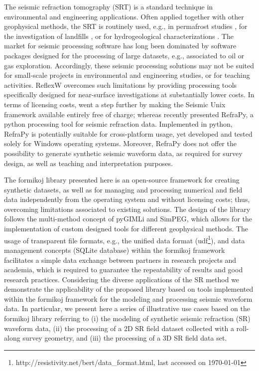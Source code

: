 \documentclass[a4paper,fleqn]{cas-sc}
\begin{document}
The seismic refraction tomography (SRT) is a standard technique in environmental and engineering applications. Often applied together with other geophysical methods, the SRT is routinely used, e.g., in 
permafrost studies \citep[e.g.,][]{draebing2016, steiner2021}, for the investigation of landfills \citep[e.g.,][]{nguyen2018, steiner2022}, or for hydrogeological characterizations \citep[e.g.,][]{buecker2021}. 
The market for seismic processing software has long been dominated by software packages designed for the processing of large datasets, e.g., associated to oil or gas exploration. 
Accordingly, these seismic processing solutions may not be suited for small-scale projects in environmental and engineering studies, or for teaching activities. 
ReflexW overcomes such limitations by providing processing tools specifically designed for near-surface investigations at substantially lower costs. In terms of licensing costs, \citet{stockwell1999} went a step further by making the Seismic Unix framework available entirely free of charge; whereas \citet{guedes2022} recently presented RefraPy, a python processing tool for seismic refraction data. 
Implemented in python, RefraPy is potentially suitable for cross-platform usage, yet \citet{guedes2022} developed and tested solely for Windows operating systems. Moreover, RefraPy does not offer the possibility to generate synthetic seismic waveform data, as required for survey design, as well as teaching and interpretation purposes.

The formikoj library presented here is an open-source framework for creating synthetic datasets, as well as for managing and processing numerical and field data independently from the operating system and without licensing costs; thus, overcoming limitations associated to existing solutions. The design of the library follows the multi-method concept of pyGIMLi and SimPEG, which allows for the implementation of custom designed tools for different geophysical methods. 
The usage of transparent file formats, e.g., the unified data format (udf\footnote{http://resistivity.net/bert/data\_format.html, last accessed on \today}), and data management concepts (SQLite database) within the formikoj framework facilitates a simple data exchange between partners in research projects and academia, which is required to guarantee the repeatability of results and good research practices.
Considering the diverse applications of the SR method we demonstrate the applicability of the proposed library based on tools implemented within the formikoj framework for the modeling and processing seismic waveform data. 
In particular, we present here a series of illustrative use cases based on the formikoj library referring to (i) the modeling of synthetic seismic refraction (SR) waveform data, (ii) the processing of a 2D SR field dataset collected with a roll-along survey geometry, and (iii) the processing of a 3D SR field data set. 
\end{document}
